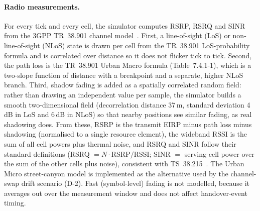 \paragraph{Radio measurements.}
For every tick and every cell, the simulator computes RSRP, RSRQ and SINR from
the 3GPP TR~38.901 channel model~\cite{tr38901}.
First, a line-of-sight (LoS) or non-line-of-sight (NLoS) state is drawn per cell
from the TR~38.901 LoS-probability formula and is correlated over distance so it
does not flicker tick to tick. Second, the path loss is the TR~38.901 Urban Macro
formula (Table~7.4.1-1), which is a two-slope function of distance with a
breakpoint and a separate, higher NLoS branch. Third, shadow fading is added as a
spatially correlated random field: rather than drawing an independent value per
sample, the simulator builds a smooth two-dimensional field (decorrelation
distance 37\,m, standard deviation 4\,dB in LoS and 6\,dB in NLoS) so that nearby
positions see similar fading, as real shadowing does. From these, RSRP is the
transmit EIRP minus path loss minus shadowing (normalised to a single resource
element), the wideband RSSI is the sum of all cell powers plus thermal noise, and
RSRQ and SINR follow their standard definitions (RSRQ $= N\cdot$RSRP$/$RSSI; SINR
$=$ serving-cell power over the sum of the other cells plus noise), consistent
with TS~38.215~\cite{ts38215}. The Urban Micro street-canyon model is implemented
as the alternative used by the channel-swap drift scenario (D-2). Fast
(symbol-level) fading is not modelled, because it averages out over the
measurement window and does not affect handover-event timing.

